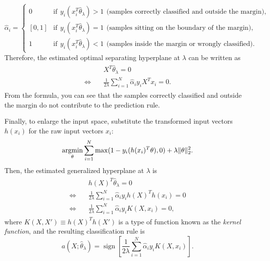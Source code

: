\documentclass[12pt]{article}
\DeclareMathOperator*{\sign}{sign}
\newcommand{\argmin}{\mathop{\rm argmin}\limits}
\begin{document}
\begin{equation*}
\hat{\alpha}_i =
\begin{cases}
0 & \text{if} \hspace{5pt} y_i (x_i^T \hat{\theta}_{\lambda}) > 1 \hspace{5pt} \text{(samples correctly classified and outside the margin)},\\
[0,1] & \text{if} \hspace{5pt} y_i (x_i^T \hat{\theta}_{\lambda}) = 1 \hspace{5pt} \text{(samples sitting on the boundary of the margin)},\\
1 & \text{if} \hspace{5pt} y_i (x_i^T \hat{\theta}_{\lambda}) < 1 \hspace{5pt} \text{(samples inside the margin or wrongly classified)}.
\end{cases}
\end{equation*}
Therefore, the estimated optimal separating hyperplane at $\lambda$ can be written as
\begin{eqnarray*}
\begin{aligned}
&X^T \hat{\theta}_{\lambda} = 0\\
\Leftrightarrow \quad &\frac{1}{2 \lambda} \sum_{i=1}^N \hat{\alpha}_i y_i X^T x_i = 0.
\end{aligned}
\end{eqnarray*}
From the formula, you can see that the samples correctly classified and outside the margin do not contribute to the prediction rule.

Finally, to enlarge the input space, substitute the transformed input vectors $h(x_i)$ for the raw input vectors $x_i$:
\begin{equation*}
\argmin_{\theta} \sum_{i=1}^N \max (1 - y_i (h(x_i)^T \theta),0) + \lambda \|\theta\|_2^2.
\end{equation*}
Then, the estimated generalized hyperplane at $\lambda$ is
\begin{eqnarray*}
\begin{aligned}
&h(X)^T \hat{\theta}_{\lambda} = 0\\
\Leftrightarrow \quad &\frac{1}{2 \lambda} \sum_{i=1}^N \hat{\alpha}_i y_i h(X)^T h(x_i) = 0\\
\Leftrightarrow \quad &\frac{1}{2 \lambda} \sum_{i=1}^N \hat{\alpha}_i y_i K(X,x_i) = 0,
\end{aligned}
\end{eqnarray*}
where $K(X,X') \equiv h(X)^T h(X')$ is a type of function known as the {\it kernel function}, and the resulting classification rule is
\begin{equation*}
a(X;\hat{\theta}_{\lambda}) = \sign[\frac{1}{2 \lambda} \sum_{i=1}^N \hat{\alpha}_i y_i K(X,x_i)].
\end{equation*}
\end{document}
